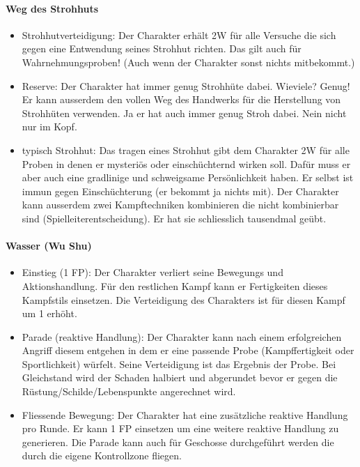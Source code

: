 \documentclass{article}
\begin{document}
\paragraph{Weg des Strohhuts}

\begin{itemize}
\item Strohhutverteidigung: Der Charakter erhält 2W für alle Versuche die sich gegen eine Entwendung seines Strohhut richten. Das gilt auch für Wahrnehmungsproben! (Auch wenn der Charakter sonst nichts mitbekommt.)
\item Reserve: Der Charakter hat immer genug Strohhüte dabei. Wieviele? Genug! Er kann ausserdem den vollen Weg des Handwerks für die Herstellung von Strohhüten verwenden. Ja er hat auch immer genug Stroh dabei. Nein nicht nur im Kopf.
\item typisch Strohhut: Das tragen eines Strohhut gibt dem Charakter 2W für alle Proben in denen er mysteriös oder einschüchternd wirken soll. Dafür muss er aber auch eine gradlinige und schweigsame Persönlichkeit haben. Er selbst ist immun gegen Einschüchterung (er bekommt ja nichts mit). Der Charakter kann ausserdem zwei Kampftechniken kombinieren die nicht kombinierbar sind (Spielleiterentscheidung). Er hat sie schliesslich tausendmal geübt.
\end{itemize}

\paragraph{Wasser (Wu Shu)}

\begin{itemize}
\item Einstieg (1 FP): Der Charakter verliert seine Bewegungs und Aktionshandlung. Für den restlichen Kampf kann er Fertigkeiten dieses Kampfstils einsetzen. Die Verteidigung des Charakters ist für diesen Kampf um 1 erhöht.
\item Parade (reaktive Handlung): Der Charakter kann nach einem erfolgreichen Angriff diesem entgehen in dem er eine passende Probe (Kampffertigkeit oder Sportlichkeit) würfelt. Seine Verteidigung ist das Ergebnis der Probe. Bei Gleichstand wird der Schaden halbiert und abgerundet bevor er gegen die Rüstung/Schilde/Lebenspunkte angerechnet wird.
\item Fliessende Bewegung: Der Charakter hat eine zusätzliche reaktive Handlung pro Runde. Er kann 1 FP einsetzen um eine weitere reaktive Handlung zu generieren. Die Parade kann auch für Geschosse durchgeführt werden die durch die eigene Kontrollzone fliegen.
\end{itemize}
\end{document}
